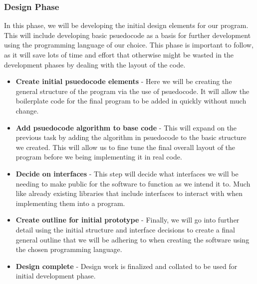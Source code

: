 \documentclass{article}
\begin{document}
\subsubsection{Design Phase}
In this phase, we will be developing the initial design elements for our program. This will include developing basic psuedocode as a basis
for further development using the programming language of our choice. This phase is important to follow, as it will save lots of time
and effort that otherwise might be wasted in the development phases by dealing with the layout of the code.
\begin{itemize}
    \item \textbf{Create initial psuedocode elements} - Here we will be creating the general structure of the program via the use of
    psuedocode. It will allow the boilerplate code for the final program to be added in quickly without much change.
    \item \textbf{Add psuedocode algorithm to base code} - This will expand on the previous task by adding the algorithm in psuedocode to
    the basic structure we created. This will allow us to fine tune the final overall layout of the program before we being implementing it in
    real code.
    \item \textbf{Decide on interfaces} - This step will decide what interfaces we will be needing to make public for the software to
    function as we intend it to. Much like already existing libraries that include interfaces to interact with when implementing them into a
    program.
    \item \textbf{Create outline for initial prototype} - Finally, we will go into further detail using the initial structure and interface
    decisions to create a final general outline that we will be adhering to when creating the software using the chosen programming
    language.
    \item \textbf{Design complete} - Design work is finalized and collated to be used for initial development phase.
\end{itemize}
\end{document}
